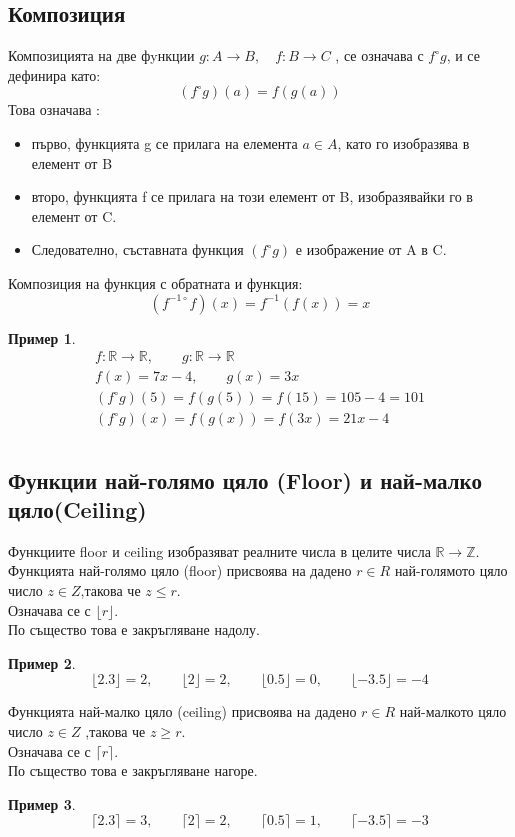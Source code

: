 \documentclass[fleqn, 12pt]{article}
\theoremstyle{definition}
\newtheorem{example}{Пример}[subsection]
\begin{document}
\subsection{Композиция}
Композицията на две фyнкции $g: A \to B, \quad f: B \to C$ , се означава с $f ^\circ g$, и се дефинира като: 
$$(f ^\circ g)(a) = f(g(a))$$
Това означава : 
\begin{itemize}
\item първо, функцията g се прилага на елемента $a \in A$, като го изобразява в елемент от B 
\item второ, функцията f се прилага на този елемент от B, изобразявайки го в елемент от C.
\item Следователно,  съставната функция $(f ^\circ g)$ е изображение от A в C.
\end{itemize}

Композиция на функция с обратната и функция:
$$(f^{-1\circ} f)(x) = f^{-1}(f(x)) = x$$

\begin{example}
\begin{gather*}
f: \mathbb{R} \to \mathbb{R}, \qquad g: \mathbb{R} \to \mathbb{R} \\
f(x) = 7x - 4, \qquad g(x) = 3x\\
(f ^\circ g)(5) = f(g(5)) = f(15) = 105 - 4 = 101\\
(f ^\circ g)(x) = f(g(x)) = f(3x) = 21x - 4\\
\end{gather*}
\end{example}

\subsection{Функции най-голямо цяло (Floor) и най-малко цяло(Ceiling)}
Функциите floor и ceiling изобразяват реалните числа в целите числа $\mathbb{R} \to \mathbb{Z}$.\\
Функцията най-голямо цяло (floor) присвоява на дадено $r \in R$ най-голямото цяло число $z \in Z$,такова че $z \leq r$.\\
Означава се с $\lfloor r \rfloor$.\\
По същество това е закръгляване надолу.
\begin{example}
$$\lfloor 2.3 \rfloor = 2,\qquad \lfloor 2 \rfloor = 2,\qquad \lfloor 0.5 \rfloor = 0,\qquad \lfloor -3.5 \rfloor = -4$$
\end{example}
Функцията най-малко цяло (ceiling) присвоява на дадено $r \in R$ най-малкото цяло число $z \in Z$ ,такова че $z \geq r$. \\
Означава се с $\lceil r \rceil $.\\
По същество това е закръгляване нагоре.
\begin{example}
$$\lceil 2.3 \rceil = 3,\qquad  \lceil 2 \rceil = 2, \qquad \lceil 0.5 \rceil = 1,\qquad \lceil -3.5 \rceil = -3$$
\end{example}
\end{document}
